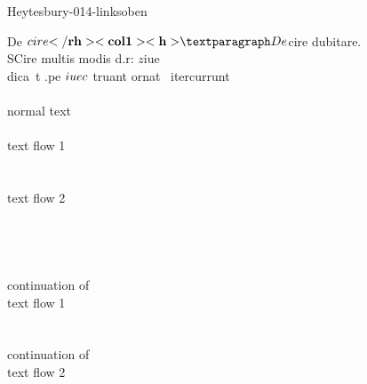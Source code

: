 \documentclass[fontsize=11pt, paper=a4, 
DIV15,
headings=normal,
parskip=half-, 
numbers=noenddot]{scrartcl}
\begin{document}
\vspace{3mm}
\begin{sampleImage}[: \, p.014]{Heytesbury-014-linksoben}

\begin{typeLatin}
De $cire\bold{</rh>} \\
\bold{<col 1>} \\
\bold{<h>}¶ De $cire  dubitare. \\
SCire multis modis d\bs.r: $z $iue \\

dica\bs~t \bs.pe $iue c\\\


$truant   ornat    \bs~itercurrunt \\

 \\
normal text \\
 \\
text flow 1 \\
 \\
 \\
text flow 2 \\
 \\ \\
 \\
 \\
continuation of \\ 
text flow 1 \\
 \\
 \\
continuation of \\ 
text flow 2 \\
 \\
\end{typeLatin}
\end{sampleImage}
\end{document}

